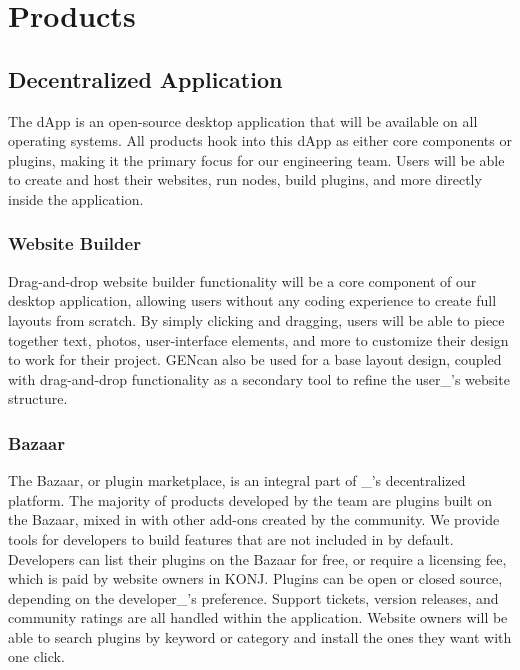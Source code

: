 \documentclass{kwp-builder}
\begin{document}

\section{Products}
\subsection{\konjure Decentralized Application}

\tab The \konjure dApp is an open-source desktop application that will be available on all operating systems. All \konjure products hook into this dApp as either core components or plugins, making it the primary focus for our engineering team. Users will be able to create and host their websites, run nodes, build plugins, and more directly inside the application.

\subsubsection{Website Builder}


\tab Drag-and-drop website builder functionality will be a core component of our desktop application, allowing users without any coding experience to create full layouts from scratch. By simply clicking and dragging, users will be able to piece together text, photos, user-interface elements, and more to customize their design to work for their project. \konjure GEN\kgen can also be used for a base layout design, coupled with drag-and-drop functionality as a secondary tool to refine the user\_{’}s website structure.

\subsubsection{Bazaar}

\tab The Bazaar, or plugin marketplace, is an integral part of \konjure\_{’}s decentralized platform. The majority of products developed by the \konjure team are plugins built on the Bazaar, mixed in with other add-ons created by the community. We provide tools for developers to build features that are not included in \konjure by default. Developers can list their plugins on the Bazaar for free, or require a licensing fee, which is paid by website owners in KONJ. Plugins can be open or closed source, depending on the developer\_{’}s preference. Support tickets, version releases, and community ratings are all handled within the application. Website owners will be able to search plugins by keyword or category and install the ones they want with one click.
\end{document}
